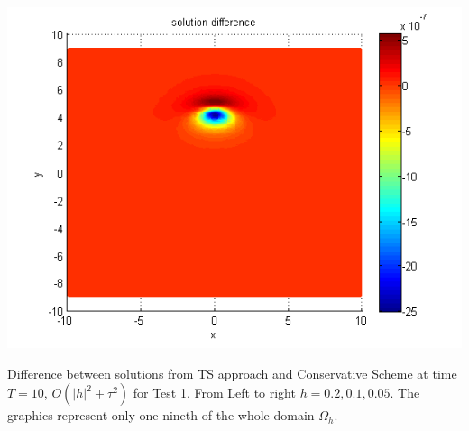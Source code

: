 \documentclass{beamer}
\begin{document}
\begin{frame}
\begin{center}
\begin{minipage}[b]{0.32\linewidth}
		\includegraphics[width=\linewidth]{figures/compare_30_bt3_c045_h005.png}
	\end{minipage}
\end{center}
Difference between solutions from TS approach and Conservative Scheme at time $T=10$, $O(|h|^2 + \tau^2)$ for Test 1. From Left to right $h=0.2, 0.1, 0.05$. The graphics represent only one nineth of the whole domain $\Omega_h$.
\end{frame}

\end{document}
